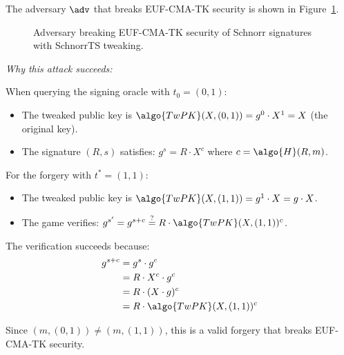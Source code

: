 \ifsolutions
\begin{mysolution}
  The adversary $\adv$ that breaks EUF-CMA-TK security is shown in Figure~\ref{fig:adversary-euf-cma-tk}.

  \begin{figure}[htb]
    \begin{center}
      \begin{tcolorbox}[width=7cm]
        \begin{pchstack}[center]
        \end{pchstack}
      \end{tcolorbox}
    \end{center}
    \caption{Adversary breaking EUF-CMA-TK security of Schnorr signatures with SchnorrTS tweaking.}
    \label{fig:adversary-euf-cma-tk}
  \end{figure}

  \emph{Why this attack succeeds:}
  
  When querying the signing oracle with $t_0 = (0, 1)$:
  \begin{itemize}
    \item The tweaked public key is $\algo{TwPK}(X, (0, 1)) = g^0 \cdot X^1 = X$ (the original key).
    \item The signature $(R, s)$ satisfies: $g^s = R \cdot X^c$ where $c = \algo{H}(R, m)$.
  \end{itemize}
  
  For the forgery with $t^* = (1, 1)$:
  \begin{itemize}
    \item The tweaked public key is $\algo{TwPK}(X, (1, 1)) = g^1 \cdot X = g \cdot X$.
    \item The game verifies: $g^{s'} = g^{s + c} \stackrel{?}{=} R \cdot \algo{TwPK}(X, (1, 1))^c$.
  \end{itemize}
  
  The verification succeeds because:
  \begin{align*}
    g^{s + c} &= g^s \cdot g^c \\
    &= R \cdot X^c \cdot g^c \\
    &= R \cdot (X \cdot g)^c \\
    &= R \cdot \algo{TwPK}(X, (1, 1))^c
  \end{align*}
  
  Since $(m, (0, 1)) \neq (m, (1, 1))$, this is a valid forgery that breaks EUF-CMA-TK security.
\end{mysolution}
\fi

